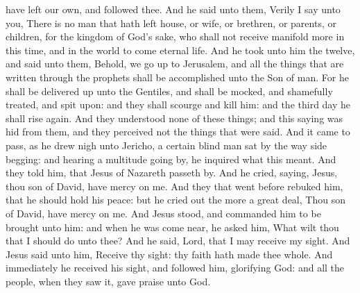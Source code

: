 have left our own, and followed thee. And he said unto them, Verily I say unto you, There is no man that hath left house, or wife, or brethren, or parents, or children, for the kingdom of God’s sake, who shall not receive manifold more in this time, and in the world to come eternal life.  And he took unto him the twelve, and said unto them, Behold, we go up to Jerusalem, and all the things that are written through the prophets shall be accomplished unto the Son of man. For he shall be delivered up unto the Gentiles, and shall be mocked, and shamefully treated, and spit upon: and they shall scourge and kill him: and the third day he shall rise again. And they understood none of these things; and this saying was hid from them, and they perceived not the things that were said.  And it came to pass, as he drew nigh unto Jericho, a certain blind man sat by the way side begging: and hearing a multitude going by, he inquired what this meant. And they told him, that Jesus of Nazareth passeth by. And he cried, saying, Jesus, thou son of David, have mercy on me. And they that went before rebuked him, that he should hold his peace: but he cried out the more a great deal, Thou son of David, have mercy on me. And Jesus stood, and commanded him to be brought unto him: and when he was come near, he asked him, What wilt thou that I should do unto thee? And he said, Lord, that I may receive my sight. And Jesus said unto him, Receive thy sight: thy faith hath made thee whole. And immediately he received his sight, and followed him, glorifying God: and all the people, when they saw it, gave praise unto God. 

